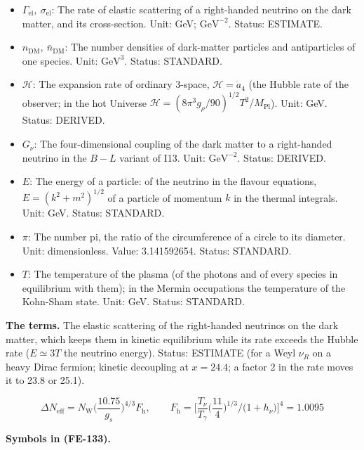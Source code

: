\documentclass[
  10pt,
]{article}
\providecommand{\tightlist}{%
  \setlength{\itemsep}{0pt}\setlength{\parskip}{0pt}}
\begin{document}
\begin{itemize}
\tightlist
\item
  \(\Gamma_{\mathrm{el}},\ \sigma_{\mathrm{el}}\): The rate of elastic
  scattering of a right-handed neutrino on the dark matter, and its
  cross-section. Unit: GeV; \(\mathrm{GeV}^{-2}\). Status: ESTIMATE.
\item
  \(n_{\mathrm{DM}},\ \bar n_{\mathrm{DM}}\): The number densities of
  dark-matter particles and antiparticles of one species. Unit:
  \(\mathrm{GeV}^{3}\). Status: STANDARD.
\item
  \(\mathcal{H}\): The expansion rate of ordinary 3-space,
  \(\mathcal{H} = \dot a_4\) (the Hubble rate of the observer; in the
  hot Universe
  \(\mathcal{H} = (8\pi^3g_\rho/90)^{1/2}T^2/M_{\mathrm{Pl}}\)). Unit:
  GeV. Status: DERIVED.
\item
  \(G_\nu\): The four-dimensional coupling of the dark matter to a
  right-handed neutrino in the \(B - L\) variant of I13. Unit:
  \(\mathrm{GeV}^{-2}\). Status: DERIVED.
\item
  \(E\): The energy of a particle: of the neutrino in the flavour
  equations, \(E = (k^2 + m^2)^{1/2}\) of a particle of momentum \(k\)
  in the thermal integrals. Unit: GeV. Status: STANDARD.
\item
  \(\pi\): The number pi, the ratio of the circumference of a circle to
  its diameter. Unit: dimensionless. Value: 3.141592654. Status:
  STANDARD.
\item
  \(T\): The temperature of the plasma (of the photons and of every
  species in equilibrium with them); in the Mermin occupations the
  temperature of the Kohn-Sham state. Unit: GeV. Status: STANDARD.
\end{itemize}

\textbf{The terms.} The elastic scattering of the right-handed neutrinos
on the dark matter, which keeps them in kinetic equilibrium while its
rate exceeds the Hubble rate (\(E \simeq 3T\) the neutrino energy).
Status: ESTIMATE (for a Weyl \(\nu_R\) on a heavy Dirac fermion; kinetic
decoupling at \(x = 24.4\); a factor 2 in the rate moves it to 23.8 or
25.1).

\[
\Delta N_{\mathrm{eff}} = N_{\mathrm{W}}\Big(\frac{10.75}{g_s}\Big)^{4/3}F_{\mathrm{h}},\qquad
F_{\mathrm{h}} = \Big[\frac{T_\nu}{T_\gamma}\Big(\frac{11}{4}\Big)^{1/3}\Big/\big(1 + h_\nu\big)\Big]^4
 = 1.0095 \tag{FE-133}
\]

\textbf{Symbols in (FE-133).}
\end{document}
